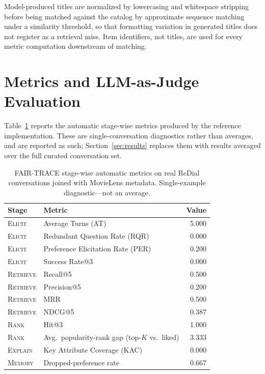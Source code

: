 \documentclass[manuscript,screen,review]{acmart}
\newcommand{\stage}[1]{\textsc{#1}}
\begin{document}
Model-produced titles are normalized by lowercasing and whitespace stripping
before being matched against the catalog by approximate sequence matching under a
similarity threshold, so that formatting variation in generated titles does not
register as a retrieval miss. Item identifiers, not titles, are used for every
metric computation downstream of matching.

\section{Metrics and LLM-as-Judge Evaluation}
\label{sec:metrics}


Table~\ref{tab:stage-metrics} reports the automatic stage-wise metrics produced by
the reference implementation. These are single-conversation diagnostics rather
than averages, and are reported as such; Section~\ref{sec:results} replaces them
with results averaged over the full curated conversation set.

\begin{table}[t]
  \caption{FAIR-TRACE stage-wise automatic metrics on real ReDial conversations
    joined with MovieLens metadata. Single-example diagnostic---not an average.}
  \label{tab:stage-metrics}
  \begin{tabular}{llr}
    \toprule
    Stage & Metric & Value \\
    \midrule
    \stage{Elicit}   & Average Turns (AT)                        & 5.000 \\
    \stage{Elicit}   & Redundant Question Rate (RQR)             & 0.000 \\
    \stage{Elicit}   & Preference Elicitation Rate (PER)         & 0.200 \\
    \stage{Elicit}   & Success Rate@3                            & 0.000 \\
    \midrule
    \stage{Retrieve} & Recall@5                                  & 0.500 \\
    \stage{Retrieve} & Precision@5                               & 0.200 \\
    \stage{Retrieve} & MRR                                       & 0.500 \\
    \stage{Retrieve} & NDCG@5                                    & 0.387 \\
    \midrule
    \stage{Rank}     & Hit@3                                     & 1.000 \\
    \stage{Rank}     & Avg.\ popularity-rank gap (top-$K$ vs.\ liked) & 3.333 \\
    \midrule
    \stage{Explain}  & Key Attribute Coverage (KAC)              & 0.000 \\
    \midrule
    \stage{Memory}   & Dropped-preference rate                   & 0.667 \\
    \bottomrule
  \end{tabular}
\end{table}
\end{document}
